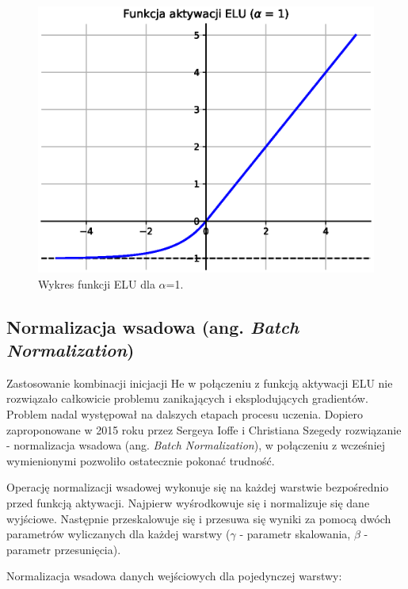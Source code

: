 \documentclass[a4paper,11pt]{article}
\begin{document}
    \begin{figure}[H]
        \label{fig:elu}
        \centering
        \includegraphics[width=\textwidth]{elu}
        \caption{Wykres funkcji ELU dla $\alpha$=1.}
    \end{figure}

    \subsection{Normalizacja wsadowa (ang. \textit{Batch Normalization})}

    Zastosowanie kombinacji inicjacji He w połączeniu z funkcją aktywacji ELU nie rozwiązało całkowicie problemu zanikających i eksplodujących gradientów. Problem nadal występował na dalszych etapach procesu uczenia. Dopiero zaproponowane w 2015 roku przez Sergeya Ioffe i Christiana Szegedy rozwiązanie - normalizacja wsadowa (ang. \textit{Batch Normalization}), w połączeniu z wcześniej wymienionymi pozwoliło ostatecznie pokonać trudność\cite{BatchNormalization2015}.

    \bigskip

    Operację normalizacji wsadowej wykonuje się na każdej warstwie bezpośrednio przed funkcją aktywacji. Najpierw wyśrodkowuje się i normalizuje się dane wyjściowe. Następnie przeskalowuje się i przesuwa się wyniki za pomocą dwóch parametrów wyliczanych dla każdej warstwy ($\gamma$ - parametr skalowania, $\beta$ - parametr przesunięcia)\cite{UczenieMaszynowe2018}.

    \bigskip

    Normalizacja wsadowa danych wejściowych dla pojedynczej warstwy:
\end{document}
